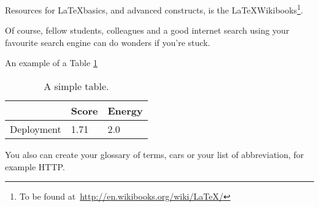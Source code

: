 Resources for \LaTeX basics, and advanced constructs, is the \LaTeX Wikibooks\footnote{To be found at~\url{http://en.wikibooks.org/wiki/LaTeX/}}.

Of course, fellow students, colleagues and a good internet search using your favourite search engine can do wonders if you're stuck.

An example of a Table \ref{tab:yourtable}

\begin{table}[h]
  \centering
  \caption{A simple table.}
  \label{tab:yourtable}
  \begin{tabular}{l|l|l} 
  \hline
   & Score & Energy  \\
  \hline
  Deployment & 1.71  & 2.0 \\
  \hline
  \end{tabular}
  \newline
  \objectsource{\objectsourceauthor}
\end{table}

You also can create your glossary of terms, \glspl{car} or your list of abbreviation, for example \acs{HTTP}\label{acro:HTTP}.
